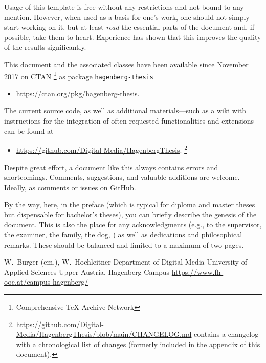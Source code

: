 Usage of this template is free without any restrictions and not bound to any
mention. However, when used as a basis for one's work, one should not simply
start working on it, but at least \emph{read} the essential parts of the
document and, if possible, take them to heart. Experience has shown that this
improves the quality of the results significantly.

This document and the associated \latex classes have been available since
November 2017 on CTAN%
\footnote{Comprehensive TeX Archive Network} 
as package \texttt{hagenberg-thesis}
%
\begin{itemize}
	\item[]\url{https://ctan.org/pkg/hagenberg-thesis}.
\end{itemize}
%
The current source code, as well as additional materials---such as a wiki with
instructions for the integration of often requested functionalities and
extensions---can be found at
%
\begin{itemize}
	\item[]\url{https://github.com/Digital-Media/HagenbergThesis}.%
	\footnote{\url{https://github.com/Digital-Media/HagenbergThesis/blob/main/CHANGELOG.md}
	contains a change\-log with a chronological list of changes (formerly
	included in the appendix of this document).}
\end{itemize}

\noindent
Despite great effort, a document like this always contains errors and
shortcomings. Comments, suggestions, and valuable additions are welcome.
Ideally, as comments or issues on GitHub.

By the way, here, in the preface (which is typical for diploma and master theses
but dispensable for bachelor's theses), you can briefly describe the genesis of
the document. This is also the place for any acknowledgments (e.g., to the
supervisor, the examiner, the family, the dog, \etc) as well as dedications and
philosophical remarks. These should be balanced and limited to a maximum of two
pages.

\vspace{6ex}
\noindent
W.\ Burger (em.), W.\ Hochleitner\newline
Department of Digital Media\newline
University of Applied Sciences Upper Austria, Hagenberg Campus \newline
\url{https://www.fh-ooe.at/campus-hagenberg/}

